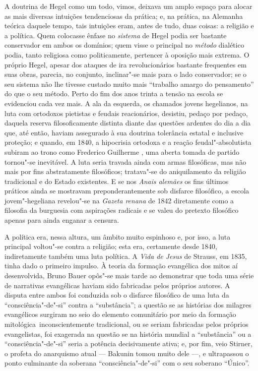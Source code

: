 A doutrina de Hegel como
um todo, vimos, deixava um amplo espaço para alocar as mais diversas
intuições tendenciosas da prática; e, na
prática, na Alemanha teórica daquele tempo, tais intuições eram, antes
de tudo, duas coisas: a religião e a política. Quem colocasse ênfase %
no \emph{sistema} de Hegel
podia ser bastante conservador em ambos os domínios; quem visse o
principal no \emph{método} dialético podia, tanto religiosa como
politicamente, pertencer à oposição mais extrema. O
próprio Hegel,
apesar dos ataques de ira revolucionários bastante frequentes em suas
obras, parecia, no conjunto, inclinar"-se mais para o lado conservador;
se o seu sistema não lhe tivesse custado muito mais ``trabalho amargo do
pensamento'' do que o seu método. Perto do fim dos anos trinta a tensão
na escola se evidenciou cada vez mais. A ala da esquerda, os chamados
jovens hegelianos, na luta com ortodoxos pietistas e feudais
reacionários, desistiu, pedaço por pedaço, daquela reserva
filosoficamente distinta diante das questões ardentes do dia a dia que,
até então, haviam assegurado à sua doutrina tolerância estatal e
inclusive proteção; e quando, em 1840, a hipocrisia 
ortodoxa e a reação feudal"-absolutista subiram ao trono como Frederico %
Guilherme , uma aberta tomada de partido tornou"-se inevitável. A luta
seria travada ainda com armas filosóficas, mas não mais por fins
abstratamente filosóficos; tratava"-se do aniquilamento
da religião tradicional e do Estado existentes. E se 
nos \emph{Anais alemães}
os fins últimos práticos ainda se mostravam 
preponderantemente sob disfarce filosófico, a escola jovem"-hegeliana
revelou"-se na \emph{Gazeta renana }de 1842 diretamente como a filosofia
da burguesia com aspirações radicais e se valeu do pretexto filosófico
apenas para ainda enganar a censura.

A política era, nessa altura, um âmbito muito espinhoso e, por isso, a
luta principal voltou"-se contra a religião; esta era, certamente desde
1840, indiretamente também uma luta política.
A \emph{Vida de Jesus} de Strauss,
em 1835, tinha dado o primeiro impulso. À teoria da formação evangélica
dos mitos aí desenvolvida,
Bruno Bauer opôs"-se mais tarde ao demonstrar que toda uma série de narrativas
evangélicas haviam sido fabricadas pelos próprios autores. A disputa
entre ambos foi conduzida sob o disfarce filosófico de uma luta da
``consciência"-de"-si'' contra a ``substância''; a questão se as histórias
dos milagres evangélicos surgiram no seio do elemento comunitário
por meio da formação mitológica\est\ inconscientemente 
tradicional, ou se seriam fabricadas pelos próprios evangelistas, foi
exagerada na questão se na história mundial a ``substância'' ou a
``consciência"-de"-si'' seria a potência decisivamente 
ativa; e, por fim, veio Stirner,
o profeta do anarquismo atual --- Bakunin tomou muito dele ---, e ultrapassou
o ponto culminante da soberana ``consciência"-de"-si'' com o seu soberano
``Único''.

